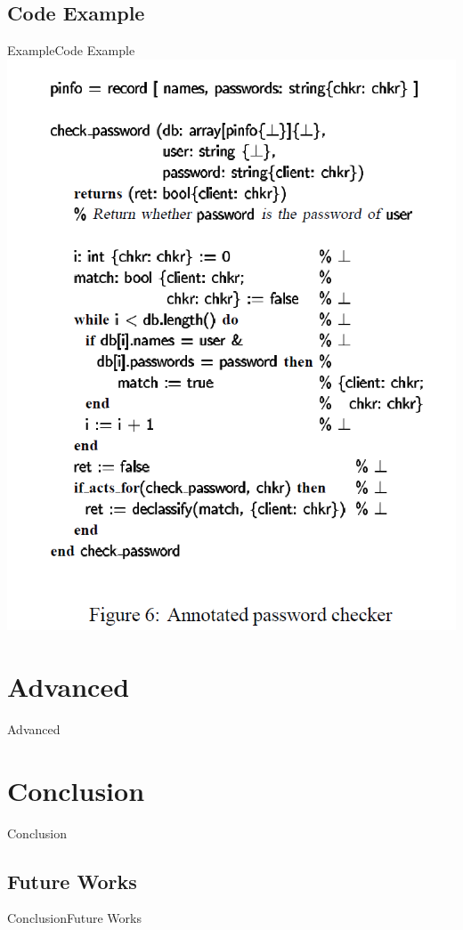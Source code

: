 \documentclass[10pt]{beamer}
\begin{document}
\subsection{Code Example}
\begin{frame}{Example}{Code Example}
	\centering
	\includegraphics[height=.7\paperheight]{passwordcheker_example.png}
\end{frame}

\section{Advanced}
\begin{frame}{Advanced}{}
\end{frame}

\section{Conclusion}
\begin{frame}{Conclusion}{}
\end{frame}

\subsection{Future Works}
\begin{frame}{Conclusion}{Future Works}
\end{frame}

{\aauwavesbg
\begin{frame}
\end{frame}}
\end{document}
